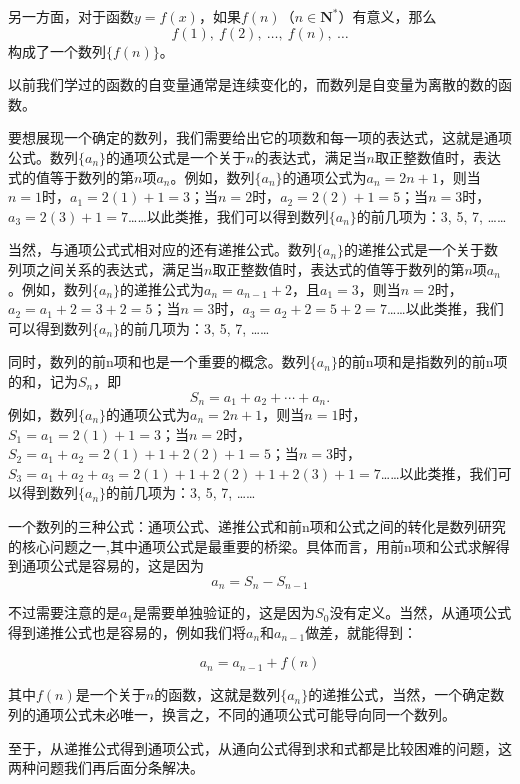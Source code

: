 \documentclass{article}
\begin{document}
另一方面，对于函数$y = f(x)$，如果$f(n)$（$n \in \mathbf{N}^*$）有意义，那么
\[
f(1),\ f(2),\ \dots,\ f(n),\ \dots
\]
构成了一个数列$\{f(n)\}$。

\begin{tcolorbox}[colback=blue!10,colframe=blue!70!black,title=]
以前我们学过的函数的自变量通常是连续变化的，而数列是自变量为离散的数的函数。
\end{tcolorbox}

要想展现一个确定的数列，我们需要给出它的项数和每一项的表达式，这就是通项公式。数列$\{a_n\}$的通项公式是一个关于$n$的表达式，满足当$n$取正整数值时，表达式的值等于数列的第$n$项$a_n$。例如，数列$\{a_n\}$的通项公式为$a_n = 2n + 1$，则当$n=1$时，$a_1 = 2(1) + 1 = 3$；当$n=2$时，$a_2 = 2(2) + 1 = 5$；当$n=3$时，$a_3 = 2(3) + 1 = 7$……以此类推，我们可以得到数列$\{a_n\}$的前几项为：3, 5, 7, ……

当然，与通项公式式相对应的还有递推公式。数列$\{a_n\}$的递推公式是一个关于数列项之间关系的表达式，满足当$n$取正整数值时，表达式的值等于数列的第$n$项$a_n$。例如，数列$\{a_n\}$的递推公式为$a_n = a_{n-1} + 2$，且$a_1 = 3$，则当$n=2$时，$a_2 = a_{1} + 2 = 3 + 2 = 5$；当$n=3$时，$a_3 = a_{2} + 2 = 5 + 2 = 7$……以此类推，我们可以得到数列$\{a_n\}$的前几项为：3, 5, 7, ……

同时，数列的前n项和也是一个重要的概念。数列$\{a_n\}$的前n项和是指数列的前n项的和，记为$S_n$，即
\[S_n = a_1 + a_2 + \cdots + a_n.\]例如，数列$\{a_n\}$的通项公式为$a_n = 2n + 1$，则当$n=1$时，$S_1 = a_1 = 2(1) + 1 = 3$；当$n=2$时，$S_2 = a_1 + a_2 = 2(1) + 1 + 2(2) + 1 = 5$；当$n=3$时，$S_3 = a_1 + a_2 + a_3 = 2(1) + 1 + 2(2) + 1 + 2(3) + 1 = 7$……以此类推，我们可以得到数列$\{a_n\}$的前几项为：3, 5, 7, ……

\begin{tcolorbox}[colback=blue!10,colframe=blue!70!black,title=]
一个数列的三种公式：通项公式、递推公式和前n项和公式之间的转化是数列研究的核心问题之一,其中通项公式是最重要的桥梁。具体而言，用前n项和公式求解得到通项公式是容易的，这是因为
$$a_n=S_n-S_{n-1}$$

不过需要注意的是$a_1$是需要单独验证的，这是因为$S_0$没有定义。当然，从通项公式得到递推公式也是容易的，例如我们将$a_n$和$a_{n-1}$做差，就能得到：

$$a_n=a_{n-1}+f(n)$$

其中$f(n)$是一个关于$n$的函数，这就是数列$\{a_n\}$的递推公式，当然，一个确定数列的通项公式未必唯一，换言之，不同的通项公式可能导向同一个数列。

至于，从递推公式得到通项公式，从通向公式得到求和式都是比较困难的问题，这两种问题我们再后面分条解决。
\end{tcolorbox}
\end{document}
